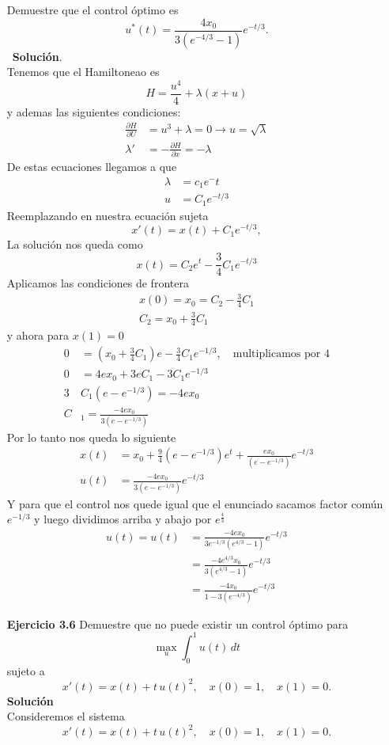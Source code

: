 \documentclass{uofa-eng-assignment}
\begin{document}
\begin{enumerate}
Demuestre que el control óptimo es
\[
u^*(t) = \frac{4x_0}{3\left(e^{-4/3}-1\right)}e^{-t/3}.
\]
\
\textbf{Solución}.\\
Tenemos que el Hamiltoneao es 
\[
H=\frac{u^4}{4}+\lambda (x+u)
\]
y ademas las siguientes condiciones:
\begin{align*}
    \frac{\partial H}{\partial U} &= u^3+\lambda=0 \to u = \sqrt{\lambda} \\
    \lambda' &= -\frac{\partial H}{\partial x}=-\lambda
\end{align*}
De estas ecuaciones llegamos a que 
\begin{align*}
    \lambda &= c_1e^-t \\
    u&= C_1e^{-t/3}
\end{align*}
Reemplazando en nuestra ecuación sujeta
\[
 x'(t) = x(t) + C_1e^{-t/3},
\]
La solución nos queda como
\[
x(t)=C_2 e^t- \frac{3}{4}C_1e^{-t/3}
\]
Aplicamos las condiciones de frontera
\begin{align*}
x(0)=x_0=C_2-\frac{3}{4}C_1 \\
C_2=x_0+\frac{3}{4}C_1 
\end{align*}
y ahora para $x(1)=0$
\begin{align*}
    0&=(x_0+\frac{3}{4}C_1)e -\frac{3}{4}C_1 e^{-1/3}, \quad \text{multiplicamos por 4}\\
    0&=4ex_0+3eC_1-3C_1e^{-1/3} \\
    3&C_1(e-e^{-1/3})=-4ex_0 \\
    C&_1=\frac{-4ex_0}{3(e-e^{-1/3})}
\end{align*}
Por lo tanto nos queda lo siguiente
\begin{align*}
    x(t)&=x_0+\frac{9}{4}{(e-e^{-1/3})}e^t+\frac{ex_0}{(e-e^{-1/3})}e^{-t/3} \\
    u(t)&=    \frac{-4ex_0}{3(e-e^{-1/3})} e^{-t/3}
\end{align*}
Y para que el control nos quede igual que el enunciado sacamos factor común $e^{-1/3}$ y luego dividimos arriba y abajo por $e^\frac{4}{3}$
\begin{align*}
    u(t)=    u(t)&=    \frac{-4ex_0}{3e^{-1/3}(e^{4/3}-1)} e^{-t/3}\\
   &=  \frac{-4e^{4/3}x_0}{3(e^{4/3}-1)} e^{-t/3} \\
   &= \frac{-4x_0}{1-3(e^{-4/3})} e^{-t/3}
\end{align*}
\item[\textbf{Ejercicio 3.6}] Demuestre que no puede existir un control óptimo para
\[
\max_{u} \int_{0}^{1} u(t)\,dt
\]
sujeto a
\[
x'(t) = x(t) + t\,u(t)^2, \quad x(0) = 1, \quad x(1) = 0.
\]
\textbf{Solución} \\
Consideremos el sistema
\[
x'(t)=x(t)+t\,u(t)^2,\quad x(0)=1,\quad x(1)=0.
\]


\end{enumerate}
\end{document}
